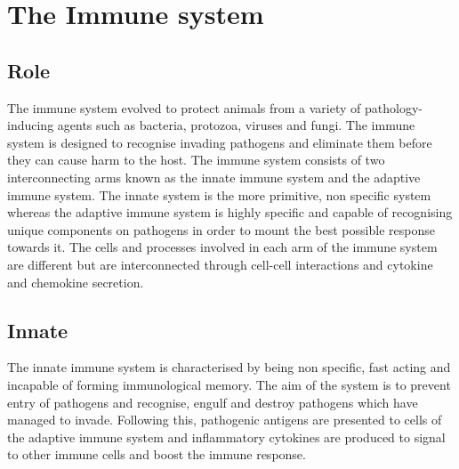 





\section{The Immune system}
\subsection{Role}

The immune system evolved to protect animals from a variety of pathology-inducing agents such as bacteria, protozoa, viruses and fungi.
The immune system is designed to recognise invading pathogens and eliminate them before they can cause harm to the host.
The immune system consists of two interconnecting arms known as the innate immune system and the adaptive immune system.
The innate system is the more primitive, non specific system whereas the adaptive immune system is highly specific and capable of recognising unique components on pathogens in order to mount the best possible response towards it.
The cells and processes involved in each arm of the immune system are different but are interconnected through cell-cell interactions and cytokine and chemokine secretion. 

\subsection{Innate}

The innate immune system is characterised by being non specific, fast acting and incapable of forming immunological memory.
The aim of the system is to prevent entry of pathogens and recognise, engulf and destroy pathogens which have managed to invade.
Following this, pathogenic antigens are presented to cells of the adaptive immune system and inflammatory cytokines are produced to signal to other immune cells and boost the immune response.

